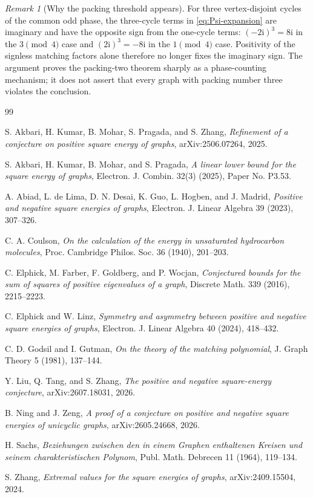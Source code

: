 \documentclass[11pt]{article}
\theoremstyle{definition}
\theoremstyle{remark}
\newtheorem{remark}[theorem]{Remark}
\newcommand{\ii}{\mathrm{i}}
\begin{document}
\begin{remark}[Why the packing threshold appears]
For three vertex-disjoint cycles of the common odd phase, the
three-cycle terms in \eqref{eq:Psi-expansion} are imaginary and have the
opposite sign from the one-cycle terms: $(-2\ii)^3=8\ii$ in the
$3\pmod4$ case and $(2\ii)^3=-8\ii$ in the $1\pmod4$ case.  Positivity of
the signless matching factors alone therefore no longer fixes the
imaginary sign.  The argument proves the packing-two theorem sharply as
a phase-counting mechanism; it does not assert that every graph with
packing number three violates the conclusion.
\end{remark}

\begin{thebibliography}{99}

S. Akbari, H. Kumar, B. Mohar, S. Pragada, and S. Zhang,
\emph{Refinement of a conjecture on positive square energy of graphs},
arXiv:2506.07264, 2025.

S. Akbari, H. Kumar, B. Mohar, and S. Pragada,
\emph{A linear lower bound for the square energy of graphs},
Electron. J. Combin. 32(3) (2025), Paper No. P3.53.

A. Abiad, L. de Lima, D. N. Desai, K. Guo, L. Hogben, and J. Madrid,
\emph{Positive and negative square energies of graphs},
Electron. J. Linear Algebra 39 (2023), 307--326.

C. A. Coulson,
\emph{On the calculation of the energy in unsaturated hydrocarbon
molecules},
Proc. Cambridge Philos. Soc. 36 (1940), 201--203.

C. Elphick, M. Farber, F. Goldberg, and P. Wocjan,
\emph{Conjectured bounds for the sum of squares of positive eigenvalues
of a graph},
Discrete Math. 339 (2016), 2215--2223.

C. Elphick and W. Linz,
\emph{Symmetry and asymmetry between positive and negative square energies
of graphs},
Electron. J. Linear Algebra 40 (2024), 418--432.

C. D. Godsil and I. Gutman,
\emph{On the theory of the matching polynomial},
J. Graph Theory 5 (1981), 137--144.

Y. Liu, Q. Tang, and S. Zhang,
\emph{The positive and negative square-energy conjecture},
arXiv:2607.18031, 2026.

B. Ning and J. Zeng,
\emph{A proof of a conjecture on positive and negative square energies
of unicyclic graphs},
arXiv:2605.24668, 2026.

H. Sachs,
\emph{Beziehungen zwischen den in einem Graphen enthaltenen Kreisen und
seinem charakteristischen Polynom},
Publ. Math. Debrecen 11 (1964), 119--134.

S. Zhang,
\emph{Extremal values for the square energies of graphs},
arXiv:2409.15504, 2024.

\end{thebibliography}
\end{document}
